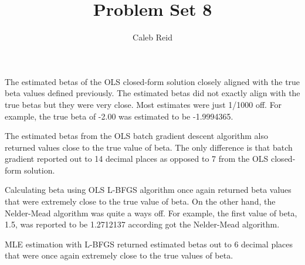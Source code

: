 \documentclass{article}
\title{Problem Set 8}
\author{Caleb Reid}
\begin{document}
\maketitle

The estimated betas of the OLS closed-form solution closely aligned with the true beta values defined previously. The estimated betas did not exactly align with the true betas but they were very close. Most estimates were just 1/1000 off. For example, the true beta of -2.00 was estimated to be -1.9994365.

The estimated betas from the OLS batch gradient descent algorithm also returned values close to the true value of beta. The only difference is that batch gradient reported out to 14 decimal places as opposed to 7 from the OLS closed-form solution.

Calculating beta using OLS L-BFGS algorithm once again returned beta values that were extremely close to the true value of beta. On the other hand, the Nelder-Mead algorithm was quite a ways off. For example, the first value of beta, 1.5, was reported to be 1.2712137 according got the Nelder-Mead algorithm.

MLE estimation with L-BFGS returned estimated betas out to 6 decimal places that were once again extremely close to the true values of beta.
\end{document}
